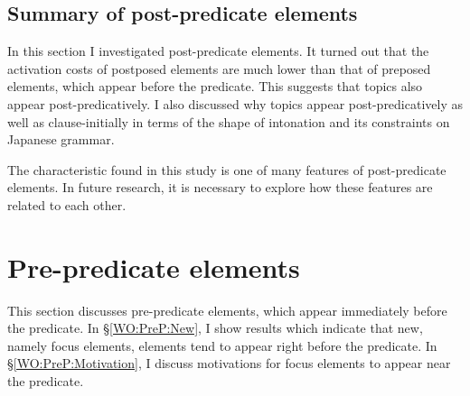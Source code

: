 \subsection{Summary of post-predicate elements}

In this section
I investigated post-predicate elements.
It turned out that
the activation costs of postposed elements are much lower than
that of preposed elements,
which appear before the predicate.
This suggests that topics also appear post-predicatively.
I also discussed why
topics appear post-predicatively as well as clause-initially
in terms of the shape of intonation and its constraints on Japanese grammar.

The characteristic found in this study is one of many features of post-predicate elements.
In future research,
it is necessary to explore how these features are related to each other.


\section{Pre-predicate elements}\label{WOPrePredEles}

This section discusses pre-predicate elements,
which appear immediately before the predicate.
In \S \ref{WO:PreP:New},
I show results which indicate that
new, namely focus elements, elements tend to appear right before the predicate.
In \S \ref{WO:PreP:Motivation},
I discuss motivations for focus elements to appear near the predicate.


